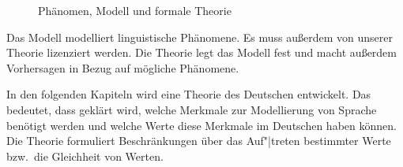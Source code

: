 \begin{figure}[htbp]
\caption{\label{abb-modell}Phänomen, Modell und formale Theorie}
\end{figure}\nocite{Netter98a}%
%
%
%
Das Modell modelliert linguistische Phänomene. Es muss außerdem
von unserer Theorie lizenziert werden.
Die Theorie legt das Modell fest %
und macht außerdem Vorhersagen in Bezug auf mögliche
Phänomene.

In den folgenden Kapiteln wird eine Theorie des Deutschen entwickelt.
Das bedeutet, dass geklärt wird, welche Merkmale zur Modellierung
von Sprache benötigt werden und welche Werte diese Merkmale im Deutschen haben
können. Die Theorie formuliert Beschränkungen über das Auf"|treten
bestimmter Werte bzw.\ die Gleichheit von Werten.


